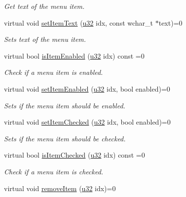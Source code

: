 \begin{DoxyCompactItemize}
\begin{DoxyCompactList}\small\item\em Get text of the menu item. \end{DoxyCompactList}\item 
virtual void \hyperlink{classirr_1_1gui_1_1IGUIContextMenu_a20d0e53213a2915a8a62c54b5aa2ff08}{set\+Item\+Text} (\hyperlink{namespaceirr_a0416a53257075833e7002efd0a18e804}{u32} idx, const wchar\+\_\+t $\ast$text)=0
\begin{DoxyCompactList}\small\item\em Sets text of the menu item. \end{DoxyCompactList}\item 
virtual bool \hyperlink{classirr_1_1gui_1_1IGUIContextMenu_a0064345c63e1f8e124e64ca96eb486e2}{is\+Item\+Enabled} (\hyperlink{namespaceirr_a0416a53257075833e7002efd0a18e804}{u32} idx) const =0
\begin{DoxyCompactList}\small\item\em Check if a menu item is enabled. \end{DoxyCompactList}\item 
virtual void \hyperlink{classirr_1_1gui_1_1IGUIContextMenu_aa3c36d6cd990f3b488be2c7f419b89ee}{set\+Item\+Enabled} (\hyperlink{namespaceirr_a0416a53257075833e7002efd0a18e804}{u32} idx, bool enabled)=0
\begin{DoxyCompactList}\small\item\em Sets if the menu item should be enabled. \end{DoxyCompactList}\item 
virtual void \hyperlink{classirr_1_1gui_1_1IGUIContextMenu_a8abbd1587dcc462f60660d7e606e954e}{set\+Item\+Checked} (\hyperlink{namespaceirr_a0416a53257075833e7002efd0a18e804}{u32} idx, bool enabled)=0
\begin{DoxyCompactList}\small\item\em Sets if the menu item should be checked. \end{DoxyCompactList}\item 
virtual bool \hyperlink{classirr_1_1gui_1_1IGUIContextMenu_a0ff910b79e5581a97aee8ec9a0679160}{is\+Item\+Checked} (\hyperlink{namespaceirr_a0416a53257075833e7002efd0a18e804}{u32} idx) const =0
\begin{DoxyCompactList}\small\item\em Check if a menu item is checked. \end{DoxyCompactList}\item 
virtual void \hyperlink{classirr_1_1gui_1_1IGUIContextMenu_af8cc0fc0f430044a318d4597f8535e9b}{remove\+Item} (\hyperlink{namespaceirr_a0416a53257075833e7002efd0a18e804}{u32} idx)=0

\end{DoxyCompactItemize}
